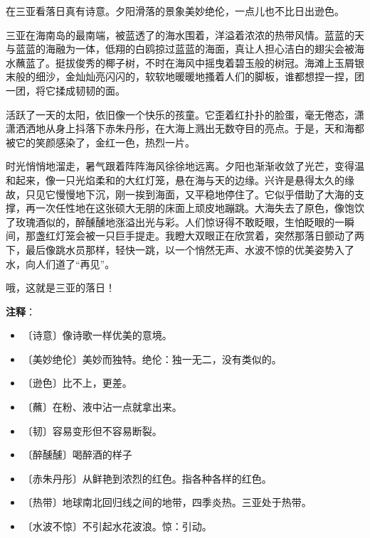 \documentclass[12pt,UTF-8,openany]{ctexbook}
\begin{document}
\begin{large}
    
    在三亚看落日真有诗意。夕阳滑落的景象美妙绝伦，一点儿也不比日出逊色。
    
    三亚在海南岛的最南端，被蓝透了的海水围着，洋溢着浓浓的热带风情。蓝蓝的天与蓝蓝的海融为一体，低翔的白鸥掠过蓝蓝的海面，真让人担心洁白的翅尖会被海水蘸蓝了。挺拔俊秀的椰子树，不时在海风中摇曳着碧玉般的树冠。海滩上玉屑银末般的细沙，金灿灿亮闪闪的，软软地暖暖地搔着人们的脚板，谁都想捏一捏，团一团，将它揉成韧韧的面。
    
    活跃了一天的太阳，依旧像一个快乐的孩童。它歪着红扑扑的脸蛋，毫无倦态，潇潇洒洒地从身上抖落下赤朱丹彤，在大海上溅出无数夺目的亮点。于是，天和海都被它的笑颜感染了，金红一色，热烈一片。
    
    时光悄悄地溜走，暑气跟着阵阵海风徐徐地远离。夕阳也渐渐收敛了光芒，变得温和起来，像一只光焰柔和的大红灯笼，悬在海与天的边缘。兴许是悬得太久的缘故，只见它慢慢地下沉，刚一挨到海面，又平稳地停住了。它似乎借助了大海的支撑，再一次任性地在这张硕大无朋的床面上顽皮地蹦跳。大海失去了原色，像饱饮了玫瑰酒似的，醉醺醺地涨溢出光与彩。人们惊讶得不敢眨眼，生怕眨眼的一瞬间，那盏红灯笼会被一只巨手提走。我瞪大双眼正在欣赏着，突然那落日颤动了两下，最后像跳水员那样，轻快一跳，以一个悄然无声、水波不惊的优美姿势入了水，向人们道了“再见”。
    
    哦，这就是三亚的落日！
    
\end{large}


\newpage

\textbf{注释}：

\vspace{-1em}

\begin{itemize}
    \setlength\itemsep{-0.2em}
    \item 〔诗意〕像诗歌一样优美的意境。
    \item 〔美妙绝伦〕美妙而独特。绝伦：独一无二，没有类似的。
    \item 〔逊色〕比不上，更差。
    \item 〔蘸〕在粉、液中沾一点就拿出来。
    \item 〔韧〕容易变形但不容易断裂。
    \item 〔醉醺醺〕喝醉酒的样子
    \item 〔赤朱丹彤〕从鲜艳到浓烈的红色。指各种各样的红色。
    \item 〔热带〕地球南北回归线之间的地带，四季炎热。三亚处于热带。
    \item 〔水波不惊〕不引起水花波浪。惊：引动。
\end{itemize}
\end{document}
